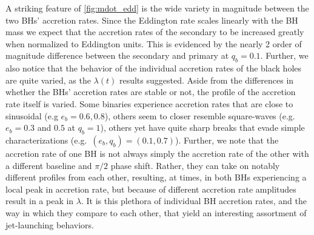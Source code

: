 \documentclass[fleqn,usenatbib]{mnras}
\begin{document}
A striking feature of \autoref{fig:mdot_edd} is the wide variety in magnitude between the two BHs' accretion rates. Since the Eddington rate scales linearly with the BH mass we expect that the accretion rates of the secondary to be increased greatly when normalized to Eddington units. This is evidenced by the nearly 2 order of magnitude difference between the secondary and primary at $q_b=0.1$. Further, we also notice that the behavior of the individual accretion rates of the black holes are quite varied, as the $\lambda(t)$ results suggested. Aside from the differences in whether the BHs' accretion rates are stable or not, the profile of the accretion rate itself is varied. Some binaries experience accretion rates that are close to sinusoidal (e.g $e_b=0.6, 0.8$), others seem to closer resemble square-waves (e.g.\ $e_b=0.3$ and $0.5$ at $q_b=1$), others yet have quite sharp breaks that evade simple characterizations (e.g.\ $(e_b, q_b) = (0.1, 0.7)$). Further, we note that the accretion rate of one BH is not always simply the accretion rate of the other with a different baseline and $\pi/2$ phase shift. Rather, they can take on notably different profiles from each other, resulting, at times, in both BHs experiencing a local peak in accretion rate, but because of different accretion rate amplitudes result in a peak in $\lambda$. It is this plethora of individual BH accretion rates, and the way in which they compare to each other, that yield an interesting assortment of jet-launching behaviors.
\end{document}
